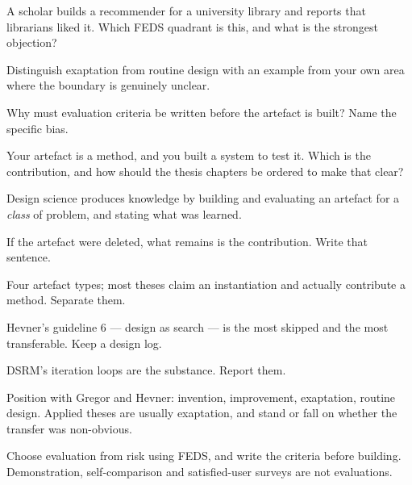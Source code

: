\begin{checkpoint}
\begin{tightnum}
  \item A scholar builds a recommender for a university library and reports
    that librarians liked it. Which FEDS quadrant is this, and what is the
    strongest objection?
  \item Distinguish exaptation from routine design with an example from your
    own area where the boundary is genuinely unclear.
  \item Why must evaluation criteria be written before the artefact is built?
    Name the specific bias.
  \item Your artefact is a method, and you built a system to test it. Which is
    the contribution, and how should the thesis chapters be ordered to make
    that clear?
\end{tightnum}
\end{checkpoint}

\begin{chaptersummary}
\begin{tight}
  \item Design science produces knowledge by building and evaluating an
    artefact for a \emph{class} of problem, and stating what was learned.
  \item If the artefact were deleted, what remains is the contribution. Write
    that sentence.
  \item Four artefact types; most theses claim an instantiation and actually
    contribute a method. Separate them.
  \item Hevner's guideline 6 --- design as search --- is the most skipped and
    the most transferable. Keep a design log.
  \item DSRM's iteration loops are the substance. Report them.
  \item Position with Gregor and Hevner: invention, improvement, exaptation,
    routine design. Applied theses are usually exaptation, and stand or fall on
    whether the transfer was non-obvious.
  \item Choose evaluation from risk using FEDS, and write the criteria before
    building. Demonstration, self-comparison and satisfied-user surveys are not
    evaluations.
\end{tight}
\end{chaptersummary}

